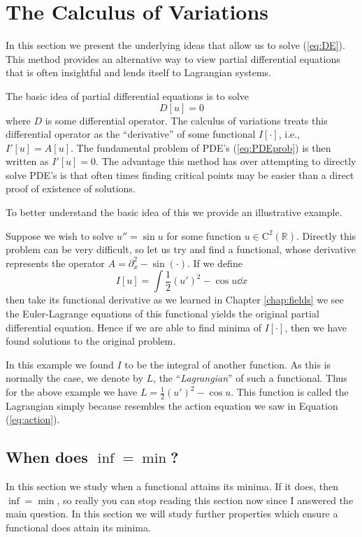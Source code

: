 \section{The Calculus of Variations}\label{sec:cov}
In this section we present the underlying ideas that allow us to solve (\ref{eq:DE}). This method provides an alternative way to view partial differential equations that is often insightful and lends itself to Lagrangian systems.

The basic idea of partial differential equations is to solve
\begin{equation}\label{eq:PDEprob}
D[u] = 0
\end{equation}
where $D$ is some differential operator. The calculus of variations treats this differential operator as the ``derivative'' of some functional $I[\cdot]$, i.e., $I'[u] = A[u]$. The fundamental problem of PDE's (\ref{eq:PDEprob}) is then written as $I'[u] = 0$. The advantage this method has over attempting to directly solve PDE's is that often times finding critical points may be easier than a direct proof of existence of solutions.

To better understand the basic idea of this we provide an illustrative example.
\begin{example}
Suppose we wish to solve $u'' = \sin{u}$ for some function $u\in\mathrm{C}^2(\mathbb{R})$. Directly this problem can be very difficult, so let us try and find a functional, whose derivative represents the operator $A = \partial_x^2 - \sin(\cdot)$. If we define
\begin{equation}
I[u] = \int \frac{1}{2}(u')^2 - \cos{u}\dd{x}
\end{equation}
then take its functional derivative as we learned in Chapter \ref{chap:fields} we see the Euler-Lagrange equations of this functional yields the original partial differential equation. Hence if we are able to find minima of $I[\cdot]$, then we have found solutions to the original problem.
\end{example}
In this example we found $I$ to be the integral of another function. As this is normally the case, we denote by $L$, the ``\textit{Lagrangian}'' of such a functional. Thus for the above example we have $L = \frac{1}{2}(u')^2 - \cos{u}$. This function is called the Lagrangian simply because resembles the action equation we saw in Equation (\ref{eq:action}).

\subsection{When does \texorpdfstring{$\inf = \min$}{inf = min}?}
In this section we study when a functional attains its minima. If it does, then $\inf = \min$, so really you can stop reading this section now since I answered the main question. In this section we will study further properties which ensure a functional does attain its minima.

